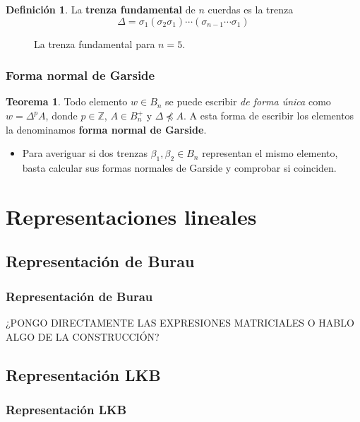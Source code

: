 \documentclass{beamer}
\theoremstyle{definition}
\newtheorem{teorema}{Teorema}
\newtheorem{defi}{Definición}
\newcommand{\Z}{\mathbb{Z}}
\begin{document}
\begin{frame}

\begin{defi}
La \textbf{trenza fundamental} de $n$ cuerdas es la trenza
$$\Delta=\sigma_1(\sigma_2\sigma_1)\cdots(\sigma_{n-1}\cdots\sigma_1)$$
\end{defi} 
\begin{figure}[h!]
\centering
{}
\caption{La trenza fundamental para $n=5$.}
\end{figure}
\end{frame}

\begin{frame}
\frametitle{Forma normal de Garside}

\begin{teorema}
Todo elemento $w\in B_n$ se puede escribir \emph{de forma única} como $w=\Delta^pA$, donde $p\in\Z$, $A\in B_n^+$ y $\Delta\not\preccurlyeq A$. A esta forma de escribir los elementos la denominamos \textbf{forma normal de Garside}.
\end{teorema}

\begin{itemize}
\item Para averiguar si dos trenzas $\beta_1,\beta_2\in B_n$ representan el mismo elemento, basta calcular sus formas normales de Garside y comprobar si coinciden. 
\end{itemize}
\end{frame}



\section{Representaciones lineales}


\subsection{Representación de Burau}
\begin{frame}
\frametitle{Representación de Burau}

¿PONGO DIRECTAMENTE LAS EXPRESIONES MATRICIALES O HABLO ALGO DE LA CONSTRUCCIÓN?
\end{frame}

\subsection{Representación LKB}
\begin{frame}
\frametitle{Representación LKB}
\end{frame}
\end{document}
